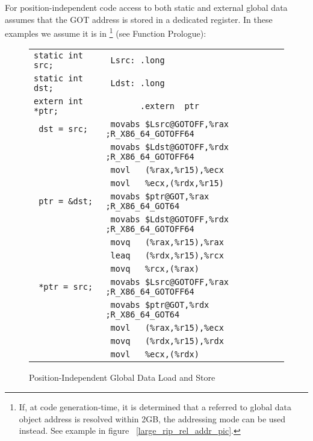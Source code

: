 For position-independent code access to both static and external global
data assumes that the GOT address is stored in a dedicated register.
In these examples we assume it is in \footnote{If,
at code generation-time, it is determined that a referred to global data
object address is resolved within 2GB, the 
addressing mode can be used instead. See example in figure~
\ref{large_rip_rel_addr_pic}.} (see Function Prologue):

\begin{figure}[H]
\Hrule
\caption{Position-Independent Global Data Load and Store}
\label{large_pic_data_load_store}
\begin{center}
\begin{footnotesize}
\begin{tabular}{|l|l|}
\hline
\verb#static int src; # & \verb# Lsrc: .long                      # \\
\verb#static int dst; # & \verb# Ldst: .long                      # \\
\verb#extern int *ptr;# & \verb#       .extern  ptr               # \\
\hline 
\verb# dst = src;     # & \verb# movabs $Lsrc@GOTOFF,%rax ;R_X86_64_GOTOFF64# \\
\verb#                # & \verb# movabs $Ldst@GOTOFF,%rdx ;R_X86_64_GOTOFF64# \\
\verb#                # & \verb# movl   (%rax,%r15),%ecx  # \\
\verb#                # & \verb# movl   %ecx,(%rdx,%r15)  # \\
\hline
\verb# ptr = &dst;    # & \verb# movabs $ptr@GOT,%rax     ;R_X86_64_GOT64# \\
\verb#                # & \verb# movabs $Ldst@GOTOFF,%rdx ;R_X86_64_GOTOFF64# \\
\verb#                # & \verb# movq   (%rax,%r15),%rax    # \\
\verb#                # & \verb# leaq   (%rdx,%r15),%rcx    # \\
\verb#                # & \verb# movq   %rcx,(%rax)         # \\
\hline
\verb# *ptr = src;    # & \verb# movabs $Lsrc@GOTOFF,%rax ;R_X86_64_GOTOFF64# \\
\verb#                # & \verb# movabs $ptr@GOT,%rdx     ;R_X86_64_GOT64# \\
\verb#                # & \verb# movl   (%rax,%r15),%ecx    # \\
\verb#                # & \verb# movq   (%rdx,%r15),%rdx    # \\
\verb#                # & \verb# movl   %ecx,(%rdx)         # \\
\hline
\end{tabular}
\end{footnotesize}
\end{center}
\end{figure}

